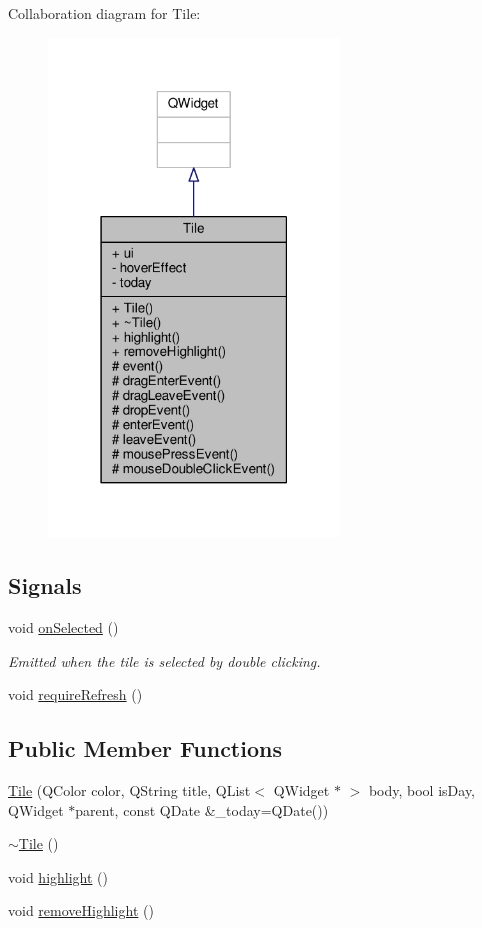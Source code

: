 Collaboration diagram for Tile\+:
\nopagebreak
\begin{figure}[H]
\begin{center}
\leavevmode
\includegraphics[width=219pt]{classTile__coll__graph}
\end{center}
\end{figure}
\subsection*{Signals}
\begin{DoxyCompactItemize}
\item 
void \hyperlink{classTile_a9df630a2ee5dc988f935f3eec20c71f1}{on\+Selected} ()
\begin{DoxyCompactList}\small\item\em Emitted when the tile is selected by double clicking. \end{DoxyCompactList}\item 
void \hyperlink{classTile_a92c6ecc49f98dd80082da0f7ed1bc196}{require\+Refresh} ()
\end{DoxyCompactItemize}
\subsection*{Public Member Functions}
\begin{DoxyCompactItemize}
\item 
\hyperlink{classTile_ad2905b6c84f17998733d24fff9986603}{Tile} (Q\+Color color, Q\+String title, Q\+List$<$ Q\+Widget $\ast$ $>$ body, bool is\+Day, Q\+Widget $\ast$parent, const Q\+Date \&\+\_\+today=Q\+Date())
\item 
\hyperlink{classTile_a98634abbd93fa13d0578d7103202d03d}{$\sim$\+Tile} ()
\item 
void \hyperlink{classTile_ab4b0ad186f7db82ddb27dff8aa74267a}{highlight} ()
\item 
void \hyperlink{classTile_aaea0c02bda80176ea382ac8751632dc1}{remove\+Highlight} ()
\end{DoxyCompactItemize}

